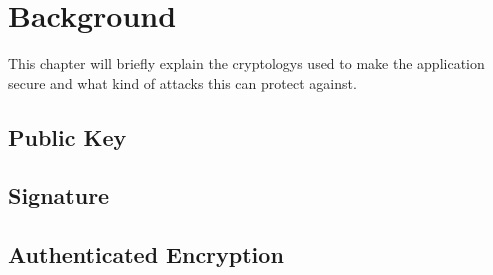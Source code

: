 
\chapter{Background}
\label{back}


This chapter will briefly explain the cryptologys used to make the application secure and what kind of attacks this can protect against. 

\section{Public Key}

\section{Signature}

\section{Authenticated Encryption}